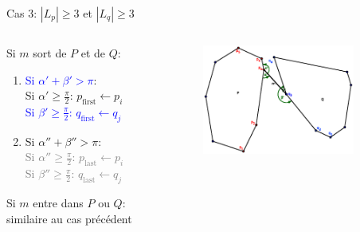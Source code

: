 \documentclass{beamer}
\begin{document}
\begin{frame}{Cas 3: $|L_p| \geq 3$ et $|L_q| \geq 3$}
	\begin{columns}[c]
	\begin{column}[T]{.5\textwidth}
		Si $m$ sort de $P$ et de $Q$:
		\begin{enumerate}
		\item \textcolor{blue}{Si $\alpha' + \beta' > \pi$}:\\
			\hspace{0.3cm} Si $\alpha' \geq \frac{\pi}{2}$: $p_{\text{first}} \leftarrow p_{i}$ \\
			\hspace{0.3cm} \textcolor{blue}{Si $\beta' \geq \frac{\pi}{2}$: $q_{\text{first}} \leftarrow q_{j}$}
		\item Si $\alpha'' + \beta'' > \pi$:\\
			\hspace{0.3cm} \textcolor{gray}{Si $\alpha'' \geq \frac{\pi}{2}$: $p_{\text{last}} \leftarrow p_{i}$} \\
			\hspace{0.3cm} \textcolor{gray}{Si $\beta'' \geq \frac{\pi}{2}$: $q_{\text{last}} \leftarrow q_{j}$}
		\end{enumerate}
		Si $m$ entre dans $P$ ou $Q$: \\
			\hspace{0.3cm} similaire au cas précédent
	\end{column}
	\begin{column}[T]{.5\textwidth}
		\includegraphics[width=5cm]{dmin3_1.eps}
	\end{column}
	\end{columns}	
\end{frame}
\end{document}
